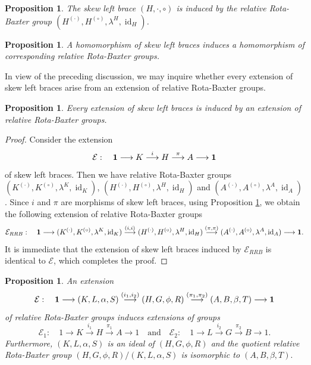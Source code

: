 \documentclass[11pt]{amsart}
\theoremstyle{thrm}
\theoremstyle{plain}
\newtheorem{prop}[thm]{Proposition}
\theoremstyle{definition}
\newcommand{\Id}{\operatorname{id}}
\numberwithin{equation}{section}
\begin{document}
\begin{prop} \label{rrb induced by slb}\cite[Proposition 3.8]{NM1}
The skew left brace  $(H,\cdot ,\circ)$ is induced by the relative Rota-Baxter group  $(H^{(\cdot)}, H^{(\circ)}, \lambda^H, \Id_H)$.
\end{prop}

\begin{prop}\label{slb to rrb homo} \cite[Proposition 4.4]{NM1}
A homomorphism of skew left braces induces a homomorphism of corresponding relative Rota-Baxter groups.
\end{prop}


In view of the preceding discussion, we may inquire whether every extension of skew left braces arise from an extension of relative Rota-Baxter groups.

\begin{prop}\label{skew brace extension from rb extension}
Every extension of skew left braces is induced by an extension of relative Rota-Baxter groups.
\end{prop}

\begin{proof}
Consider the extension
$$ \mathcal{E}: \quad {\bf 1} \longrightarrow K \stackrel{i}{\longrightarrow}  H \stackrel{\pi}{\longrightarrow} A \longrightarrow {\bf 1}$$
 of skew left braces. Then we have  relative Rota-Baxter groups $(K^{(\cdot)}, K^{(\circ)}, \lambda^K, \Id_K)$, $(H^{(\cdot)}, H^{(\circ)}, \lambda^H, \Id_H)$ and $(A^{(\cdot)}, A^{(\circ)}, \lambda^A, \Id_A)$. Since $i$ and $\pi$ are morphisms of skew left braces, using Proposition \ref{slb to rrb homo}, we obtain the following extension of relative Rota-Baxter groups
$$\mathcal{E}_{RRB} : \quad  {\bf 1} \longrightarrow (K^{(\cdot)}, K^{(\circ)}, \lambda^K, \Id_K) \stackrel{(i, i)}{\longrightarrow}  (H^{(\cdot)}, H^{(\circ)}, \lambda^H, \Id_H) \stackrel{(\pi, \pi)}{\longrightarrow} (A^{(\cdot)}, A^{(\circ)}, \lambda^A, \Id_A) \longrightarrow {\bf 1}.$$
It is immediate that the extension of skew left  braces induced by $\mathcal{E}_{RRB}$  is identical to $\mathcal{E}$, which completes the proof.
\end{proof}


\begin{prop}
An extension
$$\mathcal{E} : \quad {\bf 1} \longrightarrow (K,L, \alpha,S ) \stackrel{(i_1, i_2)}{\longrightarrow}  (H,G, \phi, R) \stackrel{(\pi_1, \pi_2)}{\longrightarrow} (A,B, \beta, T) \longrightarrow {\bf 1}$$
of relative Rota-Baxter groups	induces extensions of groups $$\mathcal{E}_1 : \quad  1 \longrightarrow K \stackrel{i_1}{\longrightarrow}  H \stackrel{\pi_1 }{\longrightarrow} A \longrightarrow 1 \quad \textrm{and} \quad \mathcal{E}_2 : \quad 1 \longrightarrow L \stackrel{i_2}{\longrightarrow}  G \stackrel{\pi_2 }{\longrightarrow} B \longrightarrow 1.$$
	Furthermore, $ (K,L, \alpha,S )$ is an ideal of $(H,G, \phi, R)$ and the quotient relative Rota-Baxter group $(H, G, \phi, R)/ (K,L, \alpha,S ) $ is isomorphic to $(A, B, \beta, T).$
\end{prop}
\end{document}
